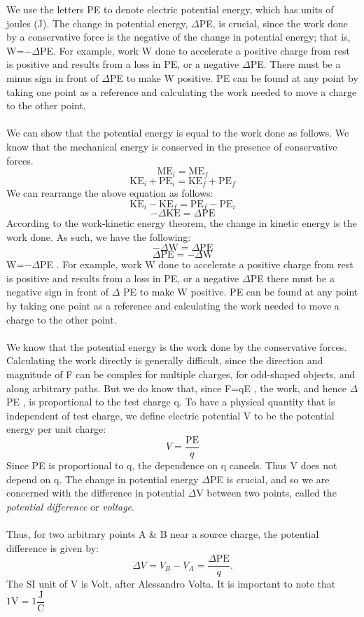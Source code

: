 \documentclass[9pt]{article}
\begin{document}
	We use the letters PE to denote electric potential energy, which has units of joules (J). The change in potential energy, $\varDelta$PE, is crucial, since the work done by a conservative force is the negative of the change in potential energy; that is, W=$-\varDelta$PE. For example, work W done to accelerate a positive charge from rest is positive and results from a loss in PE, or a negative $\varDelta$PE. There must be a minus sign in front of $\varDelta$PE to make W positive. PE can be found at any point by taking one point as a reference and calculating the work needed to move a charge to the other point. \\ \\
	We can show that the potential energy is equal to the work done as follows. We know that the mechanical energy is conserved in the presence of conservative forces. 
	$$\text{ME}_i=\text{ME}_f$$
	$$\text{KE}_i+\text{PE}_i=\text{KE}_f+\text{PE}_f$$
	We can rearrange the above equation as follows:
	$$\text{KE}_i-\text{KE}_f=\text{PE}_f-\text{PE}_i$$
	$$-\Delta\text{KE}=\Delta\text{PE}$$
	According to the work-kinetic energy theorem, the change in kinetic energy is the work done. As such, we have the following:
	$$-\Delta\text{W}=\Delta\text{PE}$$
	$$\Delta\text{PE}=-\Delta\text{W}$$
	W=$-\Delta$PE . For example, work  W  done to accelerate a positive charge from rest is positive and results from a loss in PE, or a negative  $\Delta$PE  there must be a negative sign in front of  $\Delta$ PE  to make  W  positive. PE can be found at any point by taking one point as a reference and calculating the work needed to move a charge to the other point.\\ \\
	We know that the potential energy is the work done by the conservative forces. Calculating the work directly is generally difficult, since  the direction and magnitude of F can be complex for multiple charges, for odd-shaped objects, and along arbitrary paths. But we do know that, since  F=qE , the work, and hence  $\Delta$PE , is proportional to the test charge  q. To have a physical quantity that is independent of test charge, we define electric potential  V to be the potential energy per unit charge:
	$$V=\dfrac{\text{PE}}{q}$$
	Since PE is proportional to  q, the dependence on  q  cancels. Thus  V  does not depend on  q. The change in potential energy  $\Delta$PE  is crucial, and so we are concerned with the difference in potential $\Delta$V  between two points, called the \textit{potential difference} or \textit{voltage}. \\ \\
	Thus, for two arbitrary points A \& B near a source charge, the potential difference is given by:
	$$\Delta V =V_{B}-V_{A}=\dfrac{\Delta \text{PE}}{q}.$$ 
	The SI unit of V is Volt, after Alessandro Volta. It is important to note that $1 \text{V}=1\dfrac{\text{J}}{\text{C}}$ \\ 
\end{document}

